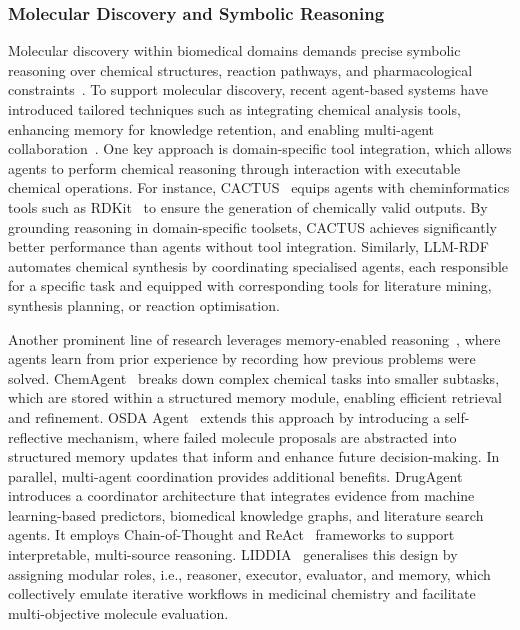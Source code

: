 \documentclass[]{selfevolagent}
\theoremstyle{plain}
\theoremstyle{definition}
\theoremstyle{remark}
\begin{document}
\subsubsection{Molecular Discovery and Symbolic Reasoning}

Molecular discovery within biomedical domains demands precise symbolic reasoning over chemical structures, reaction pathways, and pharmacological constraints~\citep{bilodeau2022generative,makke2024interpretable,m2024augmenting}. To support molecular discovery, recent agent-based systems have introduced tailored techniques such as integrating chemical analysis tools, enhancing memory for 
knowledge retention, and enabling multi-agent collaboration~\citep{mcnaughton2024cactus,inoue2025drugagent}. One key approach is domain-specific tool integration, which allows agents to perform chemical reasoning through interaction with executable chemical operations.
For instance, CACTUS~\citep{mcnaughton2024cactus} equips agents with cheminformatics tools such as RDKit~\citep{landrum2013rdkit} to ensure the generation of chemically valid outputs. By grounding reasoning in domain-specific toolsets, CACTUS achieves significantly better performance than agents without tool integration. Similarly, LLM-RDF~\citep{m2024augmenting} automates chemical synthesis by coordinating specialised agents, each responsible for a specific task and equipped with corresponding tools for literature mining, synthesis planning, or reaction optimisation.

Another prominent line of research leverages memory-enabled reasoning~\citep{hu2025osda,inoue2025drugagent}, where agents learn from prior experience by recording how previous problems were solved. ChemAgent~\citep{tang2025chemagent} breaks down complex chemical tasks into smaller subtasks, which are stored within a structured memory module, enabling efficient retrieval and refinement. OSDA Agent~\citep{hu2025osda} extends this approach by introducing a self-reflective mechanism, where failed molecule proposals are abstracted into structured memory updates that inform and enhance future decision-making. In parallel, multi-agent coordination provides additional benefits. DrugAgent~\citep{inoue2025drugagent} introduces a coordinator architecture that integrates evidence from machine learning-based predictors, biomedical knowledge graphs, and literature search agents. It employs Chain-of-Thought and ReAct~\citep{yao2023react} frameworks to support interpretable, multi-source reasoning. LIDDIA~\citep{averly2025liddia} generalises this design by assigning modular roles, i.e., reasoner, executor, evaluator, and memory, which collectively emulate iterative workflows in medicinal chemistry and facilitate multi-objective molecule evaluation.
\end{document}

